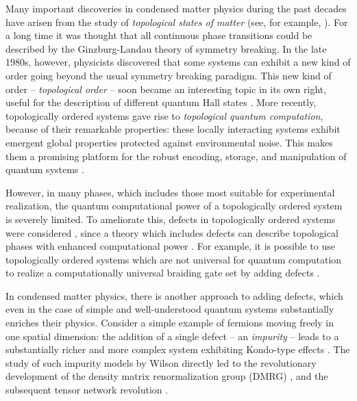 
Many important discoveries in condensed matter physics during the past decades have arisen from the study of \emph{topological states of matter} (see, for example, \cite{Wen07,NSSFD08,HK10,QZ11}). For a long time it was thought that all continuous phase transitions could be described by the Ginzburg-Landau theory of symmetry breaking. In the late 1980s, however, physicists discovered that some systems can exhibit a new kind of order going beyond the usual symmetry breaking paradigm. This new kind of order -- \emph{topological order} \cite{Wen90} -- soon became an interesting topic in its own right, useful for the description of different quantum Hall states \cite{WN90}. More recently, topologically ordered systems gave rise to \emph{topological quantum computation}, because of their remarkable properties: these locally interacting systems exhibit emergent global properties protected against environmental noise. This makes them a promising platform for the robust encoding, storage, and manipulation of quantum systems \cite{DKLP2002,Kit03,NSSFD08,Ter15,PY15,BLPSW16}.

However, in many phases, which includes those most suitable for experimental realization, the quantum computational power of a topologically ordered system is severely limited. To ameliorate this, defects in topologically ordered systems were considered \cite{RH07,Bombin2010,KK12,FSV13,BJQ13b,BASP14,JPSV15,DIP16,CCW16,BBD17,CCW17b,CCW17,BLKW17,KPEB18,ET19}, since a theory which includes defects can describe topological phases with enhanced computational power \cite{Freedman1998,FLW02b,FLW02,FKLW02}. For example, it is possible to use topologically ordered systems which are not universal for quantum computation to realize a computationally universal braiding gate set by adding defects \cite{BJQ13}.

In condensed matter physics, there is another approach to adding defects, which even in the case of simple and well-understood quantum systems substantially enriches their physics. Consider a simple example of fermions moving freely in one spatial dimension: the addition of a single defect -- an \emph{impurity} -- leads to a substantially richer and more complex system exhibiting Kondo-type effects \cite{andersonLocalizedMagneticStates1961,hewsonKondoProblemHeavy1997}. The study of such impurity models by Wilson \cite{wilsonRenormalizationGroupCritical1975} directly led to the revolutionary development of the density matrix renormalization group (DMRG) \cite{whiteDensityMatrixFormulation1992}, and the subsequent tensor network revolution \cite{bridgemanHandwavingInterpretiveDance2017}.

